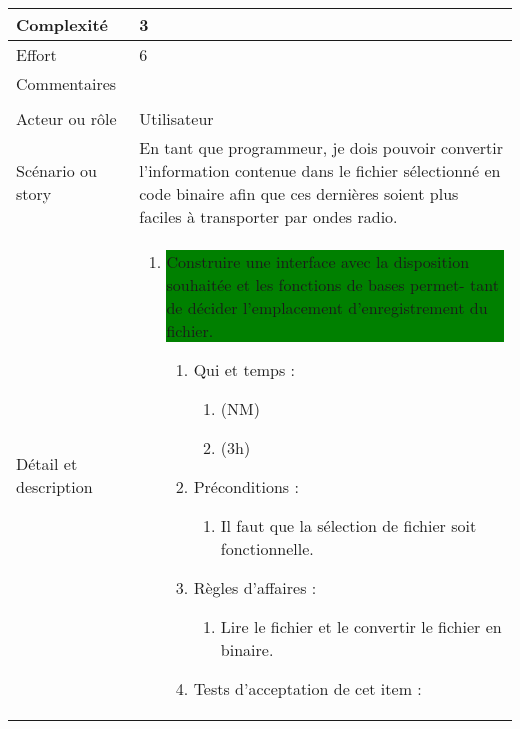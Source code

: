 \begin{longtable}{|l|p{}|}
\hline
    Complexité & 3 \\
\hline
    Effort & 6 \\
\hline
    Commentaires &  \\

\hline
    \rowcolor{Gray}
    \multicolumn{2}{|l|}{4} \\
\hline
    Acteur ou rôle & Utilisateur \\
\hline
    Scénario ou story & En tant que programmeur, je dois pouvoir convertir l’information contenue dans le fichier sélectionné en code binaire afin que ces dernières soient plus faciles à transporter par ondes radio. \\
\hline
    Détail et description &
        \begin{enumerate}[label*=\arabic*.]
            \item \colorbox{Green}{\parbox{13cm}{ Construire une interface avec la disposition souhaitée et les fonctions de bases permet- tant de décider l’emplacement d’enregistrement du fichier.}}
                \begin{enumerate}[label*=\arabic*.]
                                \item Qui et temps :
                                \begin{enumerate}[label*=\arabic*.]
                                    \item (NM)
                                    \item (3h)
                                \end{enumerate}
                                \item Préconditions :
                                \begin{enumerate}[label*=\arabic*.]
                                    \item Il faut que la sélection de fichier soit fonctionnelle.
                                \end{enumerate}
                                \item Règles d'affaires :
                                \begin{enumerate}[label*=\arabic*.]
                                    \item Lire le fichier et le convertir le fichier en binaire. 
                                \end{enumerate}
                                \item Tests d'acceptation de cet item :
                                \begin{enumerate}[label*=\arabic*.]

\end{enumerate}
\end{enumerate}
\end{enumerate}
\end{longtable}
